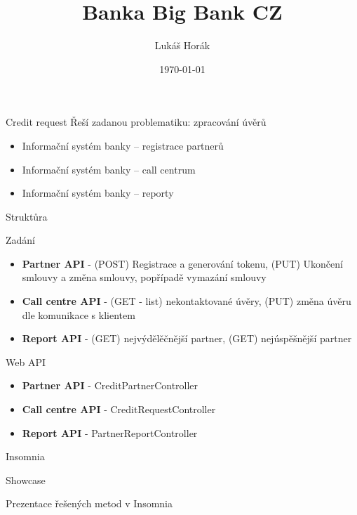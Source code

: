\documentclass{beamer}
\title[Vigour Alfa spol. s.r.o.]{Banka Big Bank CZ} %
\author{Lukáš Horák} %
{
\medskip
}
\date[Today]{\today}
\begin{document}
\begin{frame}
\titlepage %

\end{frame}

\begin{frame}
 \begin{block}{Credit request}
		Řeší zadanou problematiku: zpracování úvěrů
		\begin{itemize}
			\item Informační systém banky – registrace partnerů
			\item Informační systém banky – call centrum
			\item Informační systém banky – reporty
		\end{itemize}
	\end{block}
\end{frame}

\begin{frame}{Struktůra}
	\begin{block}{Zadání}
		\begin{itemize}
			\item \textbf{Partner API} - (POST) Registrace a generování tokenu, (PUT) Ukončení smlouvy a změna smlouvy, popřípadě vymazání smlouvy    
			\item \textbf{Call centre API} - (GET - list) nekontaktované úvěry, (PUT) změna úvěru dle komunikace s klientem
			\item \textbf{Report API} - (GET) nejvýdělěčnější partner, (GET) nejúspěšnější partner
		\end{itemize}
	\end{block}

	\begin{block}{Web API}
		\begin{itemize}
			\item \textbf{Partner API} - CreditPartnerController
			\item \textbf{Call centre API} - CreditRequestController
			\item \textbf{Report API} - PartnerReportController
		\end{itemize}
	\end{block}
\end{frame}

\begin{frame}{Insomnia}
	\begin{block}{Showcase}
		\Large{\centerline{Prezentace řešených metod v Insomnia}}
	\end{block}
\end{frame}
\end{document}
